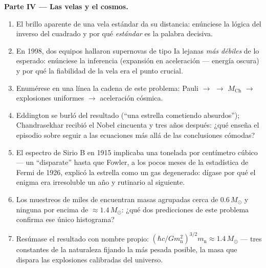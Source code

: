 \begin{problem}
\medskip\noindent\textbf{Parte IV --- Las velas y el
cosmos.}
\begin{enumerate}[resume]
  \item El brillo aparente de una vela estándar da su
        distancia: enúnciese la lógica del inverso del cuadrado y por qué
        \emph{estándar} es la palabra decisiva.
  \item En 1998, dos equipos hallaron supernovas de tipo Ia lejanas
        \emph{más débiles} de lo esperado: enúnciese la inferencia
        (expansión en aceleración --- energía oscura) y por qué
        la fiabilidad de la vela era el punto crucial.
  \item Enumérese en una línea la cadena de este problema: Pauli $\to$
         $\to$ $M_{\text{Ch}}$ $\to$ explosiones
        uniformes $\to$ aceleración cósmica.
  \item Eddington se burló del resultado (``una estrella cometiendo
        absurdos''); Chandrasekhar recibió el Nobel
        cincuenta y tres años después: ¿qué enseña el episodio sobre
        seguir a las ecuaciones más allá de las conclusiones cómodas?
  \item El espectro de Sirio B en 1915 implicaba una tonelada por centímetro
        cúbico --- un ``disparate'' hasta que Fowler, a los pocos meses de
        la estadística de Fermi de 1926, explicó la estrella como un gas
        degenerado: dígase por qué el enigma era irresoluble un
        año y rutinario al siguiente.
  \item Los muestreos de miles de  encuentran masas
        agrupadas cerca de $0.6\,M_\odot$ y ninguna por encima de
        $\approx1.4\,M_\odot$: ¿qué dos predicciones de este
        problema confirma ese único histograma?
  \item Resúmase el resultado con nombre propio: $(\hbar c/Gm_{\text{n}}^2)^{
        3/2}m_{\text{n}} \approx 1.4\,M_\odot$ --- tres constantes
        de la naturaleza fijando la  más pesada posible, la
        masa que dispara las explosiones calibradas del universo.
\end{enumerate}
\end{problem}
